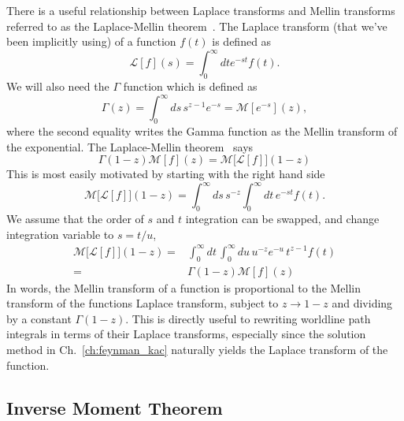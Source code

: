 There is a useful relationship between Laplace transforms and Mellin transforms referred to as the Laplace-Mellin theorem~\cite{Lew1975}.  
The Laplace transform (that we've been implicitly using) of a function $f(t)$ is defined as
\begin{equation}
\mathcal{L}[f](s) = \int_0^\infty dt e^{-st} f(t).
\end{equation}
We will also need the $\Gamma$ function which is defined as  
\begin{equation}
\Gamma(z) = \int_0^\infty ds\, s^{z-1} e^{-s} = \mathcal{M}[e^{-s}](z),
\end{equation}
where the second equality writes the Gamma function as the Mellin transform of the exponential.  
The Laplace-Mellin theorem~\cite{Lew1975} says
\begin{equation}
  \Gamma(1-z)\mathcal{M}[f](z) = \mathcal{M}\big[\mathcal{L}[f]\big](1-z)\label{eq:Laplace-Mellin}
\end{equation}
This is most easily motivated by starting with the right hand side
\begin{equation}
\mathcal{M}\big[\mathcal{L}[f]\big](1-z) = 
\int_0^\infty ds\, s^{-z} \int_0^\infty dt\,e^{-st} f(t).
\end{equation}
We assume that the order of $s$ and $t$ integration can be swapped, and change integration variable to $s=t/u$,
\begin{align}
\mathcal{M}\big[\mathcal{L}[f]\big](1-z)=&\int_0^\infty dt\,\int_0^\infty du\, u^{-z} e^{-u}\,t^{z-1} f(t) \\
=& \Gamma(1-z)\mathcal{M}[f](z)
\end{align}
In words, the Mellin transform of a function is proportional to the Mellin transform of the functions
Laplace transform, subject to $z\rightarrow 1-z$ and dividing by a constant $\Gamma(1-z)$.  This is 
directly useful to rewriting worldline path integrals in terms of their Laplace transforms, especially
since the solution method in Ch.~\ref{ch:feynman_kac} naturally yields the Laplace transform of the function.

\subsection{Inverse Moment Theorem}


